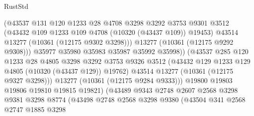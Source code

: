 \begin{lexlean}{RustStd}
\begin{coremodule}
                                  (@43537
                                    @131
                                    @120
                                    @1233
                                    @28
                                    @4708
                                    @3298
                                    @3292
                                    @3753
                                    @9301
                                    @3512
                                    (@43432 @109 @1233 @109 @4708 (@10320 (@43437 @109)) @19453)
                                    @43514
                                    @13277
                                    (@10361 (@12175 @9302 @3298)))
                                  @13277
                                  (@10361 (@12175 @9292 @9308)))
                                @35977
                                @35980
                                @35983
                                @35987
                                @35992
                                @35998))
                            (@43537
                              @285
                              @120
                              @1233
                              @28
                              @4805
                              @3298
                              @3292
                              @3753
                              @9326
                              @3512
                              (@43432 @129 @1233 @129 @4805 (@10320 (@43437 @129)) @19762)
                              @43514
                              @13277
                              (@10361 (@12175 @9327 @3298)))
                            @13277
                            (@10361 (@12175 @9284 @9333)))
                          @19800
                          @19803
                          @19806
                          @19810
                          @19815
                          @19821)
                        (@43489
                          @9343
                          @2748
                          @2607
                          @2568
                          @3298
                          @9381
                          @3298
                          @8774
                          (@43498
                            @2748
                            @2568
                            @3298
                            @9380
                            (@43504
                              @341
                              @2568
                              @2747
                              @1885
                              @3298

\end{coremodule}
\end{lexlean}
